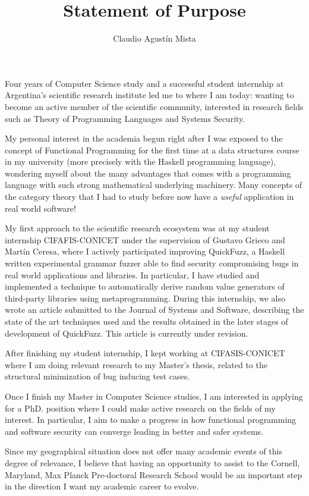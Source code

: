 \documentclass[helvetica,openbib,logo,notitle,flagCMYK,totpages]{europecv}
\title{Statement of Purpose}
\author{Claudio Agust\'in Mista}
\date{}
\begin{document}

\maketitle 
   
    Four years of Computer Science study and a successful student internship at
    Argentina's scientific research institute led me to where I am today:
    wanting to become an active member of the scientific community, interested
    in research fields such as Theory of Programming Languages and Systems
    Security. 

    My personal interest in the academia begun right after I was exposed to the
    concept of Functional Programming for the first time at a data structures
    course in my university (more precisely with the Haskell programming
    language), wondering myself about the many advantages that comes with a
    programming language with such strong mathematical underlying machinery.
    Many concepts of the category theory that I had to study before now have a
    \emph{useful} application in real world software! 

    My first approach to the scientific research ecosystem was at my student
    internship CIFAFIS-CONICET under the supervision of Gustavo Grieco and
    Mart\'in Ceresa, where I actively participated improving QuickFuzz, a
    Haskell written experimental grammar fuzzer able to find security
    compromising bugs in real world applications and libraries. In particular,
    I have studied and implemented a technique to automatically derive random
    value generators of third-party libraries using metaprogramming. During
    this internship, we also wrote an article submitted to the Journal of
    Systems and Software, describing the state of the art techniques used and
    the results obtained in the later stages of development of QuickFuzz. This
    article is currently under revision. 

    After finishing my student internship, I kept working at CIFASIS-CONICET
    where I am doing relevant research to my Master's thesis, related to the
    structural minimization of bug inducing test cases.   

    Once I finish my Master in Computer Science studies, I am interested in
    applying for a PhD. position where I could make active research on the
    fields of my interest. In particular, I aim to make a progress in how
    functional programming and software security can converge leading in better
    and safer systems. 

    Since my geographical situation does not offer many academic events of this
    degree of relevance, I believe that having an opportunity to assist to the
    Cornell, Maryland, Max Planck Pre-doctoral Research School would be an
    important step in the direction I want my academic career to evolve.
\end{document}
